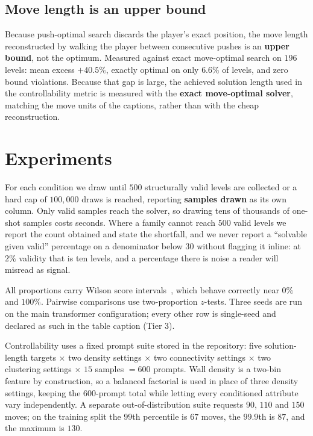 \documentclass[conference]{IEEEtran}
\begin{document}
\subsection{Move length is an upper bound}
Because push-optimal search discards the player's exact position, the move length
reconstructed by walking the player between consecutive pushes is an
\textbf{upper bound}, not the optimum. Measured against exact move-optimal search
on $196$ levels: mean excess $+40.5\%$, exactly optimal on only $6.6\%$ of
levels, and zero bound violations. Because that gap is large, the achieved
solution length used in the controllability metric is measured with the
\textbf{exact move-optimal solver}, matching the move units of the captions,
rather than with the cheap reconstruction.

\section{Experiments}
\label{sec:experiments}

For each condition we draw until $500$ structurally valid levels are collected
or a hard cap of $100{,}000$ draws is reached, reporting \textbf{samples drawn}
as its own column. Only valid samples reach the solver, so drawing tens of
thousands of one-shot samples costs seconds. Where a family cannot reach $500$
valid levels we report the count obtained and state the shortfall, and we never
report a ``solvable given valid'' percentage on a denominator below $30$ without
flagging it inline: at $2\%$ validity that is ten levels, and a percentage
there is noise a reader will misread as signal.

All proportions carry Wilson score intervals~\cite{wilson1927probable}, which
behave correctly near $0\%$ and $100\%$. Pairwise comparisons use two-proportion
$z$-tests. Three seeds are run on the main transformer configuration; every other
row is single-seed and declared as such in the table caption (Tier 3).

Controllability uses a fixed prompt suite stored in the repository: five
solution-length targets $\times$ two density settings $\times$ two connectivity
settings $\times$ two clustering settings $\times$ $15$ samples $=600$ prompts.
Wall density is a two-bin feature by construction, so a balanced factorial is used
in place of three density settings, keeping the $600$-prompt total while letting
every conditioned attribute vary independently. A separate out-of-distribution
suite requests $90$, $110$ and $150$ moves; on the training split the $99$th
percentile is $67$ moves, the $99.9$th is $87$, and the maximum is $130$.
\end{document}
